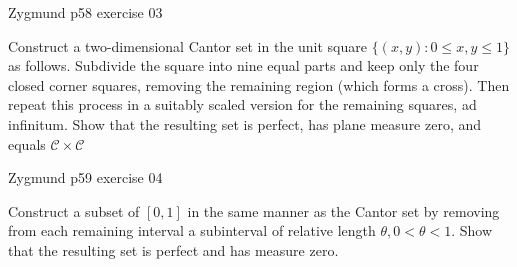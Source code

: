 \documentclass[UTF8,a4paper,10pt]{article}
\begin{document}
  \begin{Problem}[]{Zygmund p58 exercise 03}

    Construct a two-dimensional Cantor set in the unit square $\{(x, y) : 0 \leq x, y \leq 1\}$ as follows. Subdivide the square into nine equal parts and keep only the four closed corner squares, removing the remaining region (which forms a cross). Then repeat this process in a suitably scaled version for the remaining squares, ad infinitum. Show that the resulting set is perfect, has plane measure zero, and equals $\mathcal{C} \times \mathcal{C} $
  
  \end{Problem}


  \begin{Problem}[]{Zygmund p59 exercise 04}

    Construct a subset of $[0, 1]$ in the same manner as the Cantor set by
    removing from each remaining interval a subinterval of relative length
    $θ, 0 < θ < 1$. Show that the resulting set is perfect and has measure zero.
  
  \end{Problem}
\end{document}
